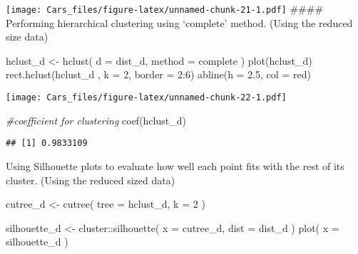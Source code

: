 \documentclass[
]{article}
\newenvironment{Shaded}{\begin{snugshade}}{\end{snugshade}}
\newcommand{\AttributeTok}[1]{\textcolor[rgb]{0.77,0.63,0.00}{#1}}
\newcommand{\CommentTok}[1]{\textcolor[rgb]{0.56,0.35,0.01}{\textit{#1}}}
\newcommand{\DecValTok}[1]{\textcolor[rgb]{0.00,0.00,0.81}{#1}}
\newcommand{\FloatTok}[1]{\textcolor[rgb]{0.00,0.00,0.81}{#1}}
\newcommand{\FunctionTok}[1]{\textcolor[rgb]{0.00,0.00,0.00}{#1}}
\newcommand{\NormalTok}[1]{#1}
\newcommand{\OtherTok}[1]{\textcolor[rgb]{0.56,0.35,0.01}{#1}}
\newcommand{\SpecialCharTok}[1]{\textcolor[rgb]{0.00,0.00,0.00}{#1}}
\newcommand{\StringTok}[1]{\textcolor[rgb]{0.31,0.60,0.02}{#1}}
\begin{document}
\texttt{[image: Cars\_files/figure-latex/unnamed-chunk-21-1.pdf]}
\#\#\#\# Performing hierarchical clustering using `complete' method.
(Using the reduced size data)

\begin{Shaded}
\begin{Highlighting}[]
\NormalTok{hclust\_d }\OtherTok{\textless{}{-}} \FunctionTok{hclust}\NormalTok{(}
  \AttributeTok{d =}\NormalTok{ dist\_d,}
  \AttributeTok{method =} \StringTok{\textquotesingle{}complete\textquotesingle{}}
\NormalTok{)}
\FunctionTok{plot}\NormalTok{(hclust\_d)}
\FunctionTok{rect.hclust}\NormalTok{(hclust\_d , }\AttributeTok{k =} \DecValTok{2}\NormalTok{, }\AttributeTok{border =} \DecValTok{2}\SpecialCharTok{:}\DecValTok{6}\NormalTok{)}
\FunctionTok{abline}\NormalTok{(}\AttributeTok{h =} \FloatTok{2.5}\NormalTok{, }\AttributeTok{col =} \StringTok{\textquotesingle{}red\textquotesingle{}}\NormalTok{)}
\end{Highlighting}
\end{Shaded}

\texttt{[image: Cars\_files/figure-latex/unnamed-chunk-22-1.pdf]}

\begin{Shaded}
\begin{Highlighting}[]
\CommentTok{\#coefficient for clustering}
\FunctionTok{coef}\NormalTok{(hclust\_d)}
\end{Highlighting}
\end{Shaded}

\begin{verbatim}
## [1] 0.9833109
\end{verbatim}

Using Silhouette plots to evaluate how well each point fits with the
rest of its cluster. (Using the reduced sized data)

\begin{Shaded}
\begin{Highlighting}[]
\NormalTok{cutree\_d }\OtherTok{\textless{}{-}} \FunctionTok{cutree}\NormalTok{(}
  \AttributeTok{tree =}\NormalTok{ hclust\_d,}
  \AttributeTok{k =} \DecValTok{2}
\NormalTok{)}

\NormalTok{silhouette\_d }\OtherTok{\textless{}{-}}\NormalTok{ cluster}\SpecialCharTok{::}\FunctionTok{silhouette}\NormalTok{(}
  \AttributeTok{x =}\NormalTok{ cutree\_d,}
  \AttributeTok{dist =}\NormalTok{ dist\_d}
\NormalTok{)}
\FunctionTok{plot}\NormalTok{(}
  \AttributeTok{x =}\NormalTok{ silhouette\_d}
\NormalTok{)}
\end{Highlighting}
\end{Shaded}
\end{document}
